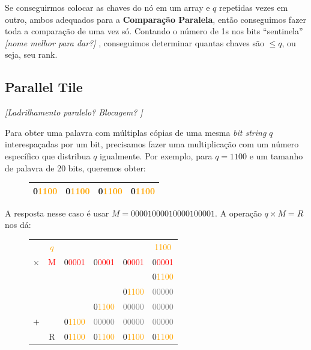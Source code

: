 Se conseguirmos colocar as chaves do nó em um array e $q$ repetidas vezes em
outro, ambos adequados para a \textbf{Comparação Paralela}, então conseguimos
fazer toda a comparação de uma vez só. Contando o número de 1s nos bits
``sentinela'' \textit{[nome melhor para dar?]} , conseguimos determinar quantas
chaves são $\leq q$, ou seja, seu rank.

\subsection{Parallel Tile}

\textit{[Ladrilhamento paralelo? Blocagem? ]}

Para obter uma palavra com múltiplas cópias de uma mesma \textit{bit string} $q$
interespaçadas por um bit, precisamos fazer uma multiplicação com um número
específico que distribua $q$ igualmente. Por exemplo, para $q=1100$ e um tamanho
de palavra de 20 bits, queremos obter:

\begin{figure}[h]
\bf \Large \centering
\begin{tabular}{|cccc|}
\hline
\textcolor{RawSienna}{0}\textcolor{Orange}{1100} &
\textcolor{RawSienna}{0}\textcolor{Orange}{1100} &
\textcolor{RawSienna}{0}\textcolor{Orange}{1100} & \textcolor{RawSienna}{0}\textcolor{Orange}{1100} \\
\hline
\end{tabular}
\end{figure}

A resposta nesse caso é usar $M=00001000010000100001$. A operação $q \times M = R$
nos dá:

\begin{figure}[h]
\bf \Large \centering
\begin{tabular}{cccccc}
& \textcolor{Orange}{$q$} & & & &
\textcolor{Orange}{\phantom{0}1100} \\
$\times$ & \textcolor{Red}{M} &
\textcolor{RawSienna}{0}\textcolor{Red}{0001} &
\textcolor{RawSienna}{0}\textcolor{Red}{0001} &
\textcolor{RawSienna}{0}\textcolor{Red}{0001} & \textcolor{RawSienna}{0}\textcolor{Red}{0001} \\
\hline
& & & & & 
\textcolor{RawSienna}{0}\textcolor{Orange}{1100} \\
& & & & 
\textcolor{RawSienna}{0}\textcolor{Orange}{1100} &
\textcolor{gray}{00000} \\
& & & 
\textcolor{RawSienna}{0}\textcolor{Orange}{1100} &
\textcolor{gray}{00000} &
\textcolor{gray}{00000} \\
$+$ & & 
\textcolor{RawSienna}{0}\textcolor{Orange}{1100} & 
\textcolor{gray}{00000} & 
\textcolor{gray}{00000} & 
\textcolor{gray}{00000} \\
\hline
& \textcolor{RawSienna}{R} &
\textcolor{RawSienna}{0}\textcolor{Orange}{1100} &
\textcolor{RawSienna}{0}\textcolor{Orange}{1100} &
\textcolor{RawSienna}{0}\textcolor{Orange}{1100} & \textcolor{RawSienna}{0}\textcolor{Orange}{1100} \\
\end{tabular}
\end{figure}

